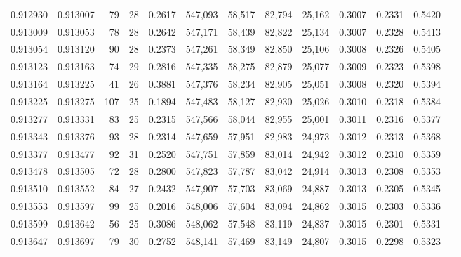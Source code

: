 \begin{tabular}{rrrrrrrrrrrrr}
0.912930 & 0.913007 &    79 &  28 &                                     0.2617 & 547,093 &  58,517 &  82,794 &  25,162 & 0.3007 & 0.2331 & 0.5420 \\
0.913009 & 0.913053 &    78 &  28 &                                     0.2642 & 547,171 &  58,439 &  82,822 &  25,134 & 0.3007 & 0.2328 & 0.5413 \\
0.913054 & 0.913120 &    90 &  28 &                                     0.2373 & 547,261 &  58,349 &  82,850 &  25,106 & 0.3008 & 0.2326 & 0.5405 \\
0.913123 & 0.913163 &    74 &  29 &                                     0.2816 & 547,335 &  58,275 &  82,879 &  25,077 & 0.3009 & 0.2323 & 0.5398 \\
0.913164 & 0.913225 &    41 &  26 &                                     0.3881 & 547,376 &  58,234 &  82,905 &  25,051 & 0.3008 & 0.2320 & 0.5394 \\
0.913225 & 0.913275 &   107 &  25 &                                     0.1894 & 547,483 &  58,127 &  82,930 &  25,026 & 0.3010 & 0.2318 & 0.5384 \\
0.913277 & 0.913331 &    83 &  25 &                                     0.2315 & 547,566 &  58,044 &  82,955 &  25,001 & 0.3011 & 0.2316 & 0.5377 \\
0.913343 & 0.913376 &    93 &  28 &                                     0.2314 & 547,659 &  57,951 &  82,983 &  24,973 & 0.3012 & 0.2313 & 0.5368 \\
0.913377 & 0.913477 &    92 &  31 &                                     0.2520 & 547,751 &  57,859 &  83,014 &  24,942 & 0.3012 & 0.2310 & 0.5359 \\
0.913478 & 0.913505 &    72 &  28 &                                     0.2800 & 547,823 &  57,787 &  83,042 &  24,914 & 0.3013 & 0.2308 & 0.5353 \\
0.913510 & 0.913552 &    84 &  27 &                                     0.2432 & 547,907 &  57,703 &  83,069 &  24,887 & 0.3013 & 0.2305 & 0.5345 \\
0.913553 & 0.913597 &    99 &  25 &                                     0.2016 & 548,006 &  57,604 &  83,094 &  24,862 & 0.3015 & 0.2303 & 0.5336 \\
0.913599 & 0.913642 &    56 &  25 &                                     0.3086 & 548,062 &  57,548 &  83,119 &  24,837 & 0.3015 & 0.2301 & 0.5331 \\
0.913647 & 0.913697 &    79 &  30 &                                     0.2752 & 548,141 &  57,469 &  83,149 &  24,807 & 0.3015 & 0.2298 & 0.5323 \\

\end{tabular}

